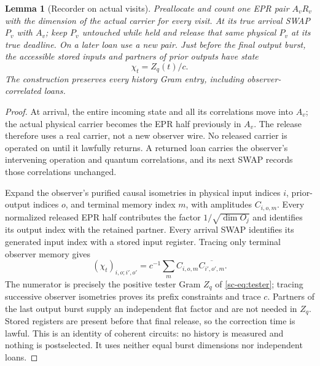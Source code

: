 \documentclass[11pt]{article}
\newtheorem{lemma}[theorem]{Lemma}
\theoremstyle{definition}
\theoremstyle{remark}
\begin{document}
\begin{lemma}[Recorder on actual visits]\label{sc-lem:recorder}
Preallocate and count one EPR pair $A_vR_v$ with the dimension of the actual carrier for every visit. At its true arrival SWAP $P_v$ with $A_v$; keep $P_v$ untouched while held and release that same physical $P_v$ at its true deadline. On a later loan use a new pair. Just before the final output burst, the accessible stored inputs and partners of prior outputs have state
\begin{equation}\label{sc-eq:record}
\chi_t=Z_q(t)/c.
\end{equation}
The construction preserves every history Gram entry, including observer-correlated loans.
\end{lemma}
\begin{proof}
At arrival, the entire incoming state and all its correlations move into $A_v$; the actual physical carrier becomes the EPR half previously in $A_v$. The release therefore uses a real carrier, not a new observer wire. No released carrier is operated on until it lawfully returns. A returned loan carries the observer's intervening operation and quantum correlations, and its next SWAP records those correlations unchanged.

Expand the observer's purified causal isometries in physical input indices $i$, prior-output indices $o$, and terminal memory index $m$, with amplitudes $C_{i,o,m}$. Every normalized released EPR half contributes the factor $1/\sqrt{\dim O_j}$ and identifies its output index with the retained partner. Every arrival SWAP identifies its generated input index with a stored input register. Tracing only terminal observer memory gives
\[
(\chi_t)_{i,o;i',o'}=c^{-1}\sum_m C_{i,o,m}\overline{C_{i',o',m}}.
\]
The numerator is precisely the positive tester Gram $Z_q$ of \eqref{sc-eq:tester}; tracing successive observer isometries proves its prefix constraints and trace $c$. Partners of the last output burst supply an independent flat factor and are not needed in $Z_q$. Stored registers are present before that final release, so the correction time is lawful. This is an identity of coherent circuits: no history is measured and nothing is postselected. It uses neither equal burst dimensions nor independent loans.
\end{proof}
\end{document}
